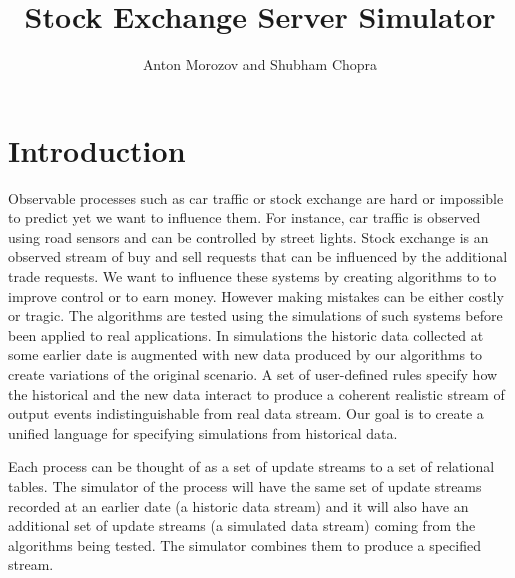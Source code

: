 \documentclass{article}
\begin{document}
    
\title{Stock Exchange Server Simulator}
\author{Anton Morozov and Shubham Chopra}
\maketitle
    
\section{Introduction}

Observable processes such as car traffic or stock exchange are hard or impossible to predict yet we want to influence them. For instance, car traffic is observed using road sensors and can be controlled by street lights. Stock exchange is an observed stream of buy and sell requests that can be influenced by the additional trade requests. We want to influence these systems by creating algorithms to to improve control or to earn money. However making mistakes can be either costly or tragic. The algorithms are tested using the simulations of such systems before been applied to real applications. In simulations the historic data collected at some earlier date is augmented with new data produced by our algorithms to create variations of the original scenario. A set of user-defined rules specify how the historical and the new data interact to produce a coherent realistic stream of output events indistinguishable from real data stream. Our goal is to create a unified language for specifying simulations from historical data.

Each process can be thought of as a set of update streams to a set of relational tables. The simulator of the process will have the same set of update streams recorded at an earlier date (a historic data stream) and it will also have an additional set of update streams (a simulated data stream) coming from the algorithms being tested. The simulator combines them to produce a specified stream. 

\end{document}
